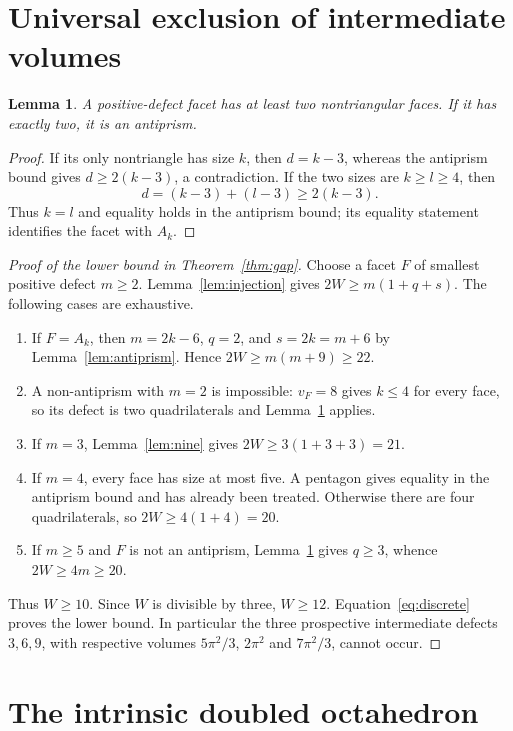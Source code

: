 \documentclass[11pt]{article}
\newtheorem{lemma}[theorem]{Lemma}
\theoremstyle{remark}
\begin{document}
\section{Universal exclusion of intermediate volumes}
\begin{lemma}\label{lem:two}
A positive-defect facet has at least two nontriangular faces. If it
has exactly two, it is an antiprism.
\end{lemma}
\begin{proof}
If its only nontriangle has size $k$, then $d=k-3$, whereas the
antiprism bound gives $d\ge2(k-3)$, a contradiction. If the two sizes
are $k\ge l\ge4$, then
\[
 d=(k-3)+(l-3)\ge2(k-3).
\]
Thus $k=l$ and equality holds in the antiprism bound; its equality
statement identifies the facet with $A_k$.
\end{proof}

\begin{proof}[Proof of the lower bound in Theorem~\ref{thm:gap}]
Choose a facet $F$ of smallest positive defect $m\ge2$.
Lemma~\ref{lem:injection} gives $2W\ge m(1+q+s)$.
The following cases are exhaustive.
\begin{enumerate}
\item If $F=A_k$, then $m=2k-6$, $q=2$, and
$s=2k=m+6$ by Lemma~\ref{lem:antiprism}. Hence
$2W\ge m(m+9)\ge22$.
\item A non-antiprism with $m=2$ is impossible: $v_F=8$ gives
$k\le4$ for every face, so its defect is two quadrilaterals and
Lemma~\ref{lem:two} applies.
\item If $m=3$, Lemma~\ref{lem:nine} gives $2W\ge3(1+3+3)=21$.
\item If $m=4$, every face has size at most five. A pentagon gives
equality in the antiprism bound and has already been treated. Otherwise
there are four quadrilaterals, so $2W\ge4(1+4)=20$.
\item If $m\ge5$ and $F$ is not an antiprism,
Lemma~\ref{lem:two} gives $q\ge3$, whence $2W\ge4m\ge20$.
\end{enumerate}
Thus $W\ge10$. Since $W$ is divisible by three, $W\ge12$.
Equation~\eqref{eq:discrete} proves the lower bound. In particular the
three prospective intermediate defects $3,6,9$, with respective
volumes $5\pi^2/3$, $2\pi^2$ and $7\pi^2/3$, cannot occur.
\end{proof}

\section{The intrinsic doubled octahedron}\label{sec:doubled}
\end{document}
